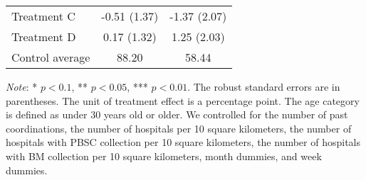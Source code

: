 \documentclass[12pt, a4paper]{article}
\begin{document}
\begin{table}[H]
\begin{threeparttable}
\begin{tabular}[t]{lcc}
\hspace{1em}Treatment C & -0.51 (1.37) & -1.37 (2.07)\\
\hspace{1em}Treatment D & 0.17 (1.32) & 1.25 (2.03)\\
\hspace{1em}Control average & 88.20 & 58.44\\
\bottomrule
\end{tabular}
\begin{tablenotes}
\item \emph{Note}: * $p < 0.1$, ** $p < 0.05$, *** $p < 0.01$. The robust standard errors are in parentheses. The unit of treatment effect is a percentage point. The age category is defined as under 30 years old or older. We controlled for the number of past coordinations, the number of hospitals per 10 square kilometers, the number of hospitals with PBSC collection per 10 square kilometers, the number of hospitals with BM collection per 10 square kilometers, month dummies, and week dummies.
\end{tablenotes}
\end{threeparttable}
\end{table}
\end{document}
